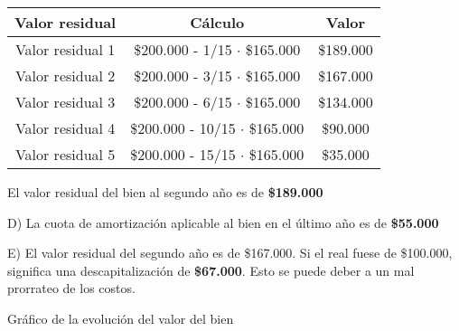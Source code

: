 \documentclass[12pt,a4paper]{article}
\begin{document}
        \begin{table}[H]
        \centering
        	\begin{tabular}{ | c | c | c | }
            	\hline
                Valor residual		&	Cálculo								&	Valor			\\ \hline
                Valor residual 1	&	\$200.000 - 1/15 $\cdot$ \$165.000	&	\$189.000		\\ \hline
                Valor residual 2	&	\$200.000 - 3/15 $\cdot$ \$165.000	&	\$167.000		\\ \hline
                Valor residual 3	&	\$200.000 - 6/15 $\cdot$ \$165.000	&	\$134.000		\\ \hline
                Valor residual 4	&	\$200.000 - 10/15 $\cdot$ \$165.000	&	\$90.000		\\ \hline
                Valor residual 5	&	\$200.000 - 15/15 $\cdot$ \$165.000	&	\$35.000		\\ \hline
			\end{tabular}
		\end{table}
        
        \par{
        	El valor residual del bien al segundo año es de \textbf{\$189.000}
            }
		
        \hrulefill
        
        D) La cuota de amortización aplicable al bien en el último año es de \textbf{\$55.000}
        
        \hrulefill
        
        E) El valor residual del segundo año es de \$167.000. Si el real fuese de \$100.000, significa una descapitalización de \textbf{\$67.000}. Esto se puede deber a un mal prorrateo de los costos.
        
        \hrulefill
        
        \par{
        	Gráfico de la evolución del valor del bien
            }
		
\end{document}
